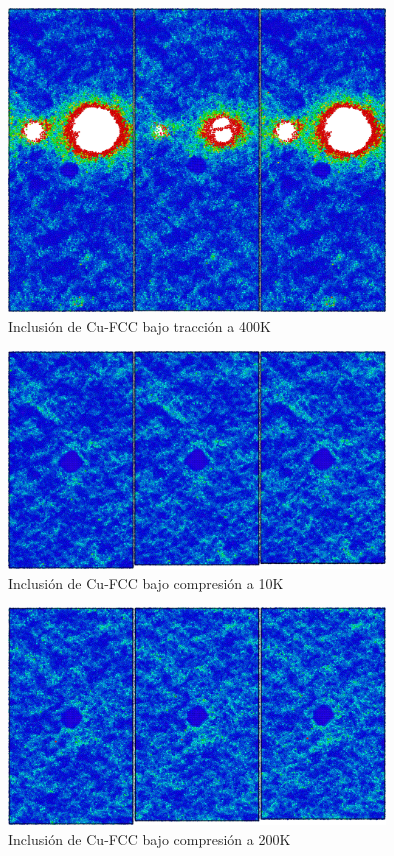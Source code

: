 \begin{figure}[htp]
\centering
\includegraphics[width=10cm]{../ResumenImagenes/Figures/NanoParticles/Snapshots/cuSphereTension_400K_Snapshots.png}
\caption[Inclusión de Cu-FCC bajo tracción a 400K]{Inclusión de Cu-FCC bajo tracción a 400K}
\label{C4:fg:snapshot_ten_FCC_400K}
\end{figure}

\begin{figure}[htp]
\centering
\includegraphics[width=10cm]{../ResumenImagenes/Figures/NanoParticles/Snapshots/cuSphereCompression_10K_Snapshots.png}
\caption[Inclusión de Cu-FCC bajo compresión a 10K]{Inclusión de Cu-FCC bajo compresión a 10K}
\label{C4:fg:snapshot_comp_FCC_10K}
\end{figure}

\begin{figure}[htp]
\centering
\includegraphics[width=10cm]{../ResumenImagenes/Figures/NanoParticles/Snapshots/cuSphereCompression_200K_Snapshots.png}
\caption[Inclusión de Cu-FCC bajo compresión a 200K]{Inclusión de Cu-FCC bajo compresión a 200K}
\label{C4:fg:snapshot_comp_FCC_200K}
\end{figure}

